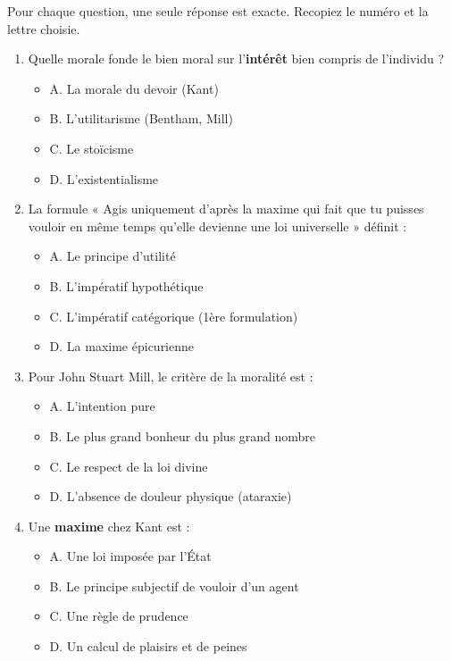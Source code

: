 \documentclass[11pt]{article}
\begin{document}
\begin{exercice}
Pour chaque question, une seule réponse est exacte. Recopiez le numéro et la lettre choisie.
\begin{enumerate}
    \item Quelle morale fonde le bien moral sur l'\textbf{intérêt} bien compris de l'individu ?
    \begin{itemize}
        \item A. La morale du devoir (Kant)
        \item B. L'utilitarisme (Bentham, Mill)
        \item C. Le stoïcisme
        \item D. L'existentialisme
    \end{itemize}
    \item La formule « Agis uniquement d'après la maxime qui fait que tu puisses vouloir en même temps qu'elle devienne une loi universelle » définit :
    \begin{itemize}
        \item A. Le principe d'utilité
        \item B. L'impératif hypothétique
        \item C. L'impératif catégorique (1ère formulation)
        \item D. La maxime épicurienne
    \end{itemize}
    \item Pour John Stuart Mill, le critère de la moralité est :
    \begin{itemize}
        \item A. L'intention pure
        \item B. Le plus grand bonheur du plus grand nombre
        \item C. Le respect de la loi divine
        \item D. L'absence de douleur physique (ataraxie)
    \end{itemize}
    \item Une \textbf{maxime} chez Kant est :
    \begin{itemize}
        \item A. Une loi imposée par l'État
        \item B. Le principe subjectif de vouloir d'un agent
        \item C. Une règle de prudence
        \item D. Un calcul de plaisirs et de peines
    \end{itemize}
\end{enumerate}
\end{exercice}
\end{document}
